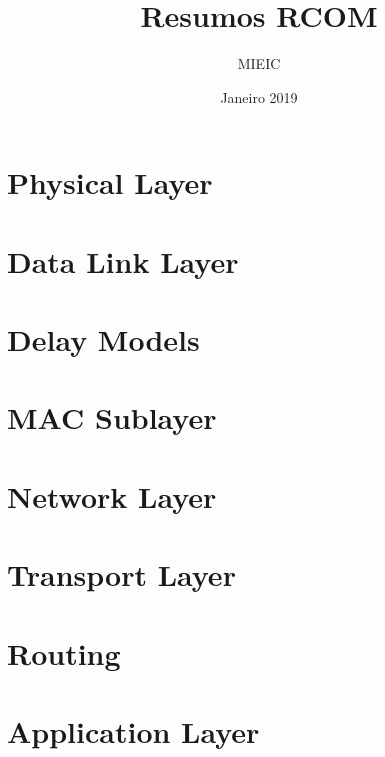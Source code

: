 \documentclass{article}
\title{Resumos RCOM}
\author{MIEIC}
\date{Janeiro 2019}
\begin{document}
 
\maketitle

\tableofcontents
 
\section{Physical Layer}


 
\section{Data Link Layer}
 


\section{Delay Models}
 


\section{MAC Sublayer}
 


\section{Network Layer}
 


\section{Transport Layer}
 


\section{Routing}
 


\section{Application Layer}
 

\end{document}
